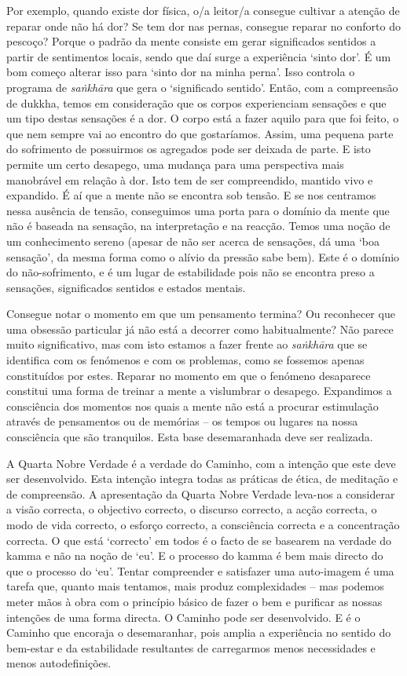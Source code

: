Por exemplo, quando existe dor física, o/a leitor/a consegue cultivar a atenção de reparar onde não há dor? Se tem dor nas pernas, consegue reparar no conforto do pescoço? Porque o padrão da mente consiste em gerar significados sentidos a partir de sentimentos locais, sendo que daí surge a experiência `sinto dor'. É um bom começo alterar isso para `sinto dor na minha perna'. Isso controla o programa de \emph{saṅkhāra} que gera o `significado sentido'. Então, com a compreensão de dukkha, temos em consideração que os corpos experienciam sensações e que um tipo destas sensações é a dor. O corpo está a fazer aquilo para que foi feito, o que nem sempre vai ao encontro do que gostaríamos. Assim, uma pequena parte do sofrimento de possuirmos os agregados pode ser deixada de parte. E isto permite um certo desapego, uma mudança para uma perspectiva mais manobrável em relação à dor. Isto tem de ser compreendido, mantido vivo e expandido. É aí que a mente não se encontra sob tensão. E se nos centramos nessa ausência de tensão, conseguimos uma porta para o domínio da mente que não é baseada na sensação, na interpretação e na reacção. Temos uma noção de um conhecimento sereno (apesar de não ser acerca de sensações, dá uma `boa sensação', da mesma forma como o alívio da pressão sabe bem). Este é o domínio do não-sofrimento, e é um lugar de estabilidade pois não se encontra preso a sensações, significados sentidos e estados mentais.

Consegue notar o momento em que um pensamento termina? Ou reconhecer que uma obsessão particular já não está a decorrer como habitualmente? Não parece muito significativo, mas com isto estamos a fazer frente ao \emph{saṅkhāra} que se identifica com os fenómenos e com os problemas, como se fossemos apenas constituídos por estes. Reparar no momento em que o fenómeno desaparece constitui uma forma de treinar a mente a vislumbrar o desapego. Expandimos a consciência dos momentos nos quais a mente não está a procurar estimulação através de pensamentos ou de memórias -- os tempos ou lugares na nossa consciência que são tranquilos. Esta base desemaranhada deve ser realizada.

A Quarta Nobre Verdade é a verdade do Caminho, com a intenção que este deve ser desenvolvido. Esta intenção integra todas as práticas de ética, de meditação e de compreensão. A apresentação da Quarta Nobre Verdade leva-nos a considerar a visão correcta, o objectivo correcto, o discurso correcto, a acção correcta, o modo de vida correcto, o esforço correcto, a consciência correcta e a concentração correcta. O que está `correcto' em todos é o facto de se basearem na verdade do kamma e não na noção de `eu'. E o processo do kamma é bem mais directo do que o processo do `eu'. Tentar compreender e satisfazer uma auto-imagem é uma tarefa que, quanto mais tentamos, mais produz complexidades -- mas podemos meter mãos à obra com o princípio básico de fazer o bem e purificar as nossas intenções de uma forma directa. O Caminho pode ser desenvolvido. E é o Caminho que encoraja o desemaranhar, pois amplia a experiência no sentido do bem-estar e da estabilidade resultantes de carregarmos menos necessidades e menos autodefinições.


